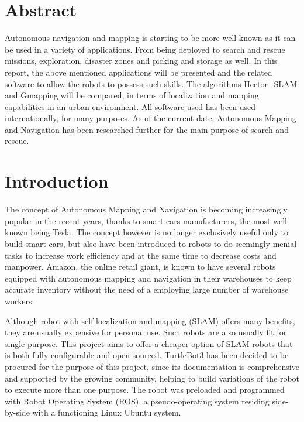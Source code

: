 \documentclass[12pt]{report}
\begin{document}

\chapter*{Abstract}

Autonomous navigation and mapping is starting to be more well known as it can be used in a variety of applications. From being deployed to search and rescue missions, exploration, disaster zones and picking and storage as well. In this report, the above mentioned applications will be presented and the related software to allow the robots to possess such skills. The algorithms Hector\_SLAM and Gmapping will be compared, in terms of localization and mapping capabilities in an urban environment. All software used has been used internationally, for many purposes. As of the current date, Autonomous Mapping and Navigation has been researched further for the main purpose of search and rescue.\par

\tableofcontents
\newpage
\listoffigures

\chapter{Introduction}
The concept of Autonomous Mapping and Navigation is becoming increasingly popular in the recent years, thanks to smart cars manufacturers, the most well known being Tesla. The concept however is no longer exclusively useful only to build smart cars, but also have been introduced to robots to do seemingly menial tasks to increase work efficiency and at the same time to decrease costs and manpower. Amazon, the online retail giant, is known to have several robots equipped with autonomous mapping and navigation in their warehouses to keep accurate inventory without the need of a employing large number of warehouse workers.\par
\vspace{1em}
Although robot with self-localization and mapping (SLAM) offers many benefits, they are usually expensive for personal use. Such robots are also usually fit for single purpose. This project aims to offer a cheaper option of SLAM robots that is both fully configurable and open-sourced. TurtleBot3 has been decided to be procured for the purpose of this project, since its documentation is comprehensive and supported by the growing community, helping to build variations of the robot to execute more than one purpose. The robot was preloaded and programmed with Robot Operating System (ROS), a pseudo-operating system residing side-by-side with a functioning Linux Ubuntu system.\par
\end{document}

